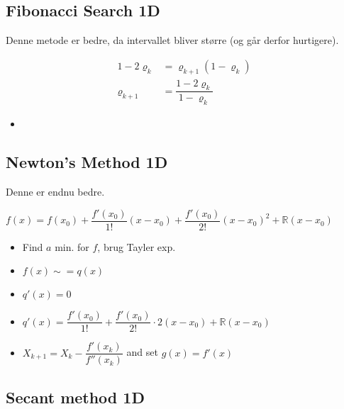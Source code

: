 \documentclass[10pt, a4]{Memoir}
\begin{document}
\subsection{Fibonacci Search 1D}
Denne metode er bedre, da intervallet bliver større (og går derfor hurtigere).

\begin{align*}
1-2 \varrho_k &= \varrho_{k+1}(1-\varrho_k) \\
\varrho_{k+1} &= \dfrac{1-2 \varrho_k}{1-\varrho_k}
\end{align*}

\begin{itemize}
	\item 

\end{itemize}



\subsection{Newton's Method 1D}
Denne er endnu bedre.

$f(x) = f(x_0) + \dfrac{f'(x_0)}{1!}(x-x_0) + \dfrac{f'(x_0)}{2!}(x-x_0)^2 + \mathbb{R}(x-x_0) $

\begin{itemize}
	\item Find $a$ min. for $f$, brug Tayler exp.
	\item $f(x) \sim{=} q(x)$
	\item $q'(x)=0 $
	\item $q'(x) = \dfrac{f'(x_0)}{1!} + \dfrac{f'(x_0)}{2!}\cdot 2(x-x_0) + \mathbb{R}(x-x_0)$
	\item $X_{k+1} = X_k-\dfrac{f'(x_k)}{f''(x_k)}$ and set $g(x) = f'(x)$
\end{itemize}


\subsection{Secant method 1D}
\end{document}
